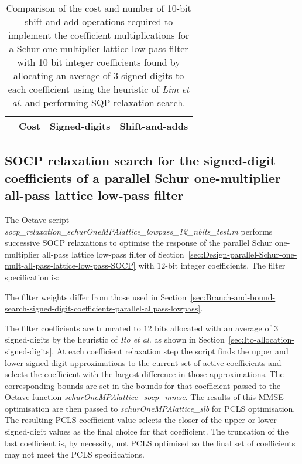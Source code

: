 \documentclass[a4paper,twoside,10pt,english]{report}
\begin{document}
\begin{table}[htb]
\centering
\begin{threeparttable}
\begin{tabular}{lccc}  \\ \toprule
& Cost&Signed-digits&Shift-and-adds\\ \midrule

\bottomrule
\end{tabular}
\end{threeparttable}
\caption[Summary of cost results for the Schur one-multiplier lattice 
low-pass filter SQP-relaxation algorithm example with 10 bit coefficients]
{Comparison of the cost and number of 10-bit shift-and-add operations required 
  to implement the coefficient multiplications for a Schur one-multiplier 
  lattice low-pass filter with 10 bit integer coefficients found by allocating 
  an average of 3 signed-digits to each coefficient using the heuristic of 
  \emph{Lim et al.} and performing SQP-relaxation search.}
\label{tab:sqp-relax-schurOneMlattice-lowpass-10-nbits-cost-summary}
\end{table}
\subsection{\label{sec:SOCP-relaxation-search-signed-digit-coefficients-lowpass-parallel-allpass-lowpass}SOCP relaxation search for the signed-digit coefficients of a parallel Schur one-multiplier all-pass lattice low-pass filter}
The Octave script 
\emph{socp\_relaxation\_schurOneMPAlattice\_lowpass\_12\_nbits\_test.m} performs
successive SOCP relaxations to optimise the response of the parallel Schur
one-multiplier all-pass lattice low-pass filter of
Section~\ref{sec:Design-parallel-Schur-one-mult-all-pass-lattice-low-pass-SOCP}
with $12$-bit integer coefficients. The filter specification is:
\begin{small}

\end{small} 
The filter weights differ from those used in
Section~\ref{sec:Branch-and-bound-search-signed-digit-coefficients-parallel-allpass-lowpass}.

The filter coefficients are truncated to $12$ bits allocated with an average
of $3$ signed-digits by the heuristic of \emph{Ito et al.} as shown in
Section~\ref{sec:Ito-allocation-signed-digits}.  At each coefficient
relaxation step the script finds the upper and lower signed-digit
approximations to the current set of active coefficients and selects the
coefficient with the largest difference in those approximations. The
corresponding bounds are set in the bounds for that coefficient passed to the
Octave function \emph{schurOneMPAlattice\_socp\_mmse}. The results of this
MMSE optimisation are then passed to \emph{schurOneMPAlattice\_slb} for PCLS
optimisation. The resulting PCLS coefficient value selects the closer of the
upper or lower signed-digit values as the final choice for that
coefficient. The truncation of the last coefficient is, by necessity, not PCLS
optimised so the final set of coefficients may not meet the PCLS
specifications.
\end{document}
